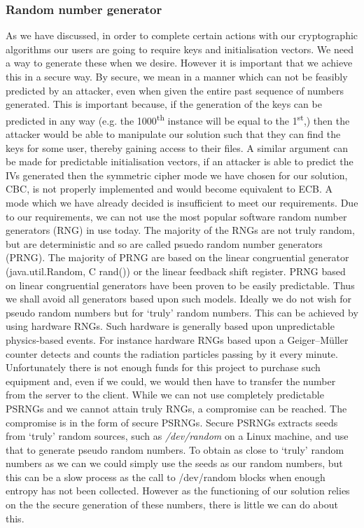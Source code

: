 \documentclass[12pt, titlepage]{article}
\begin{document}
\subsubsection{Random number generator}
As we have discussed, in order to complete certain actions with our cryptographic algorithms our users are going to require keys and initialisation vectors. We need a way to generate these when we desire. However it is important that we achieve this in a secure way. By secure, we mean in a manner which can not be feasibly predicted by an attacker, even when given the entire past sequence of numbers generated. This is important because, if the generation of the keys can be predicted in any way (e.g. the 1000\textsuperscript{th} instance will be equal to the 1\textsuperscript{st},) then the attacker would be able to manipulate our solution such that they can find the keys for some user, thereby gaining access to their files. A similar argument can be made for predictable initialisation vectors, if an attacker is able to predict the IVs generated then the symmetric cipher mode we have chosen for our solution, CBC, is not properly implemented and would become equivalent to ECB. A mode which we have already decided is insufficient to meet our requirements.
\newline \indent Due to our requirements, we can not use the most popular software random number generators (RNG) in use today. The majority of the RNGs are not truly random, but are deterministic and so are called psuedo random number generators (PRNG). The majority of PRNG are based on the linear congruential generator (java.util.Random, C rand()) or the linear feedback shift register. PRNG based on linear congruential generators have been proven to be easily predictable.\cite{lcgPRNGPredictable} Thus we shall avoid all generators based upon such models.
\newline \indent Ideally we do not wish for pseudo random numbers but for `truly' random numbers. This can be achieved by using hardware RNGs. Such hardware is generally based upon unpredictable physics-based events. For instance hardware RNGs based upon a Geiger–Müller counter detects and counts the radiation particles passing by it every minute.\cite{geigerCounter} Unfortunately there is not enough funds for this project to purchase such equipment and, even if we could, we would then have to transfer the number from the server to the client.
\newline \indent While we can not use completely predictable PSRNGs and we cannot attain truly RNGs, a compromise can be reached. The compromise is in the form of secure PSRNGs. Secure PSRNGs extracts seeds from `truly' random sources, such as \textit{/dev/random} on a Linux machine, and use that to generate pseudo random numbers. To obtain as close to `truly' random numbers as we can we could simply use the seeds as our random numbers, but this can be a slow process as the call to /dev/random blocks when enough entropy has not been collected. However as the functioning of our solution relies on the the secure generation of these numbers, there is little we can do about this.
\end{document}
